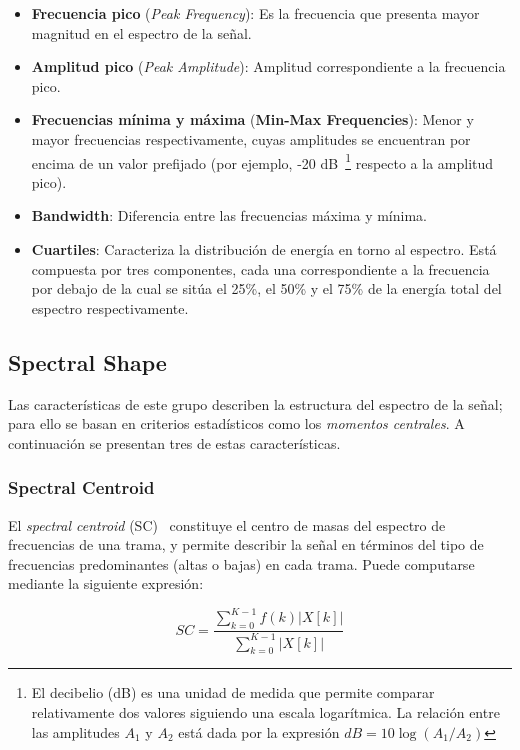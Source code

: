 \begin{itemize}
    \item \textbf{Frecuencia pico} (\textit{Peak Frequency}): Es la frecuencia que presenta mayor magnitud en el espectro de la señal.
    \item \textbf{Amplitud pico} (\textit{Peak Amplitude}): Amplitud correspondiente a la frecuencia pico.
    \item \textbf{Frecuencias mínima y máxima} (\textbf{Min-Max Frequencies}): Menor y mayor frecuencias respectivamente, cuyas amplitudes se encuentran por encima de un valor prefijado (por ejemplo, -20 dB~\footnote{El decibelio (dB) es una unidad de medida que permite comparar relativamente dos valores siguiendo una escala logarítmica.
    La relación entre las amplitudes $A_1$ y $A_2$ está dada por la expresión $dB = 10\log(A_1/A_2)$} respecto a la amplitud pico).
    \item \textbf{Bandwidth}: Diferencia entre las frecuencias máxima y mínima.
    \item \textbf{Cuartiles}: Caracteriza la distribución de energía en torno al espectro.
    Está compuesta por tres componentes, cada una correspondiente a la frecuencia por debajo de la cual se sitúa el 25\%, el 50\% y el 75\% de la energía total del espectro respectivamente.
\end{itemize}

\subsection{Spectral Shape}\label{subsec:spectralShape}

Las características de este grupo describen la estructura del espectro de la señal;
para ello se basan en criterios estadísticos como los \textit{momentos centrales}.
A continuación se presentan tres de estas características.

\subsubsection{Spectral Centroid}

El \textit{spectral centroid} (SC)~\cite{Fagerlund07,Kim05,Lasseck14,Manjunath02,Peters04} constituye el centro de masas del espectro de frecuencias de una trama, y permite describir la señal en términos del tipo de frecuencias predominantes (altas o bajas) en cada trama.
Puede computarse mediante la siguiente expresión:

\begin{equation}
    \label{eq:SC}
    SC = \frac{\sum_{k=0}^{K-1}{f(k)|X[k]|}}{\sum_{k=0}^{K-1}{|X[k]|}}
\end{equation}

